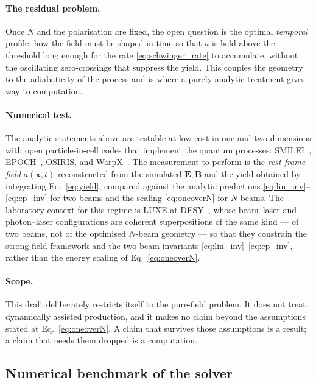 \documentclass[aps,prd,reprint,superscriptaddress,nofootinbib,floatfix]{revtex4-2}
\begin{document}
\paragraph{The residual problem.} Once $N$ and the polarisation are fixed, the
open question is the optimal \emph{temporal} profile: how the field must be
shaped in time so that $a$ is held above the threshold long enough for the
rate \eqref{eq:schwinger_rate} to accumulate, without the oscillating
zero-crossings that suppress the yield. This couples the geometry to the
adiabaticity of the process and is where a purely analytic treatment gives way
to computation.

\paragraph{Numerical test.} The analytic statements above are testable at low
cost in one and two dimensions with open particle-in-cell codes that implement
the quantum processes: SMILEI~\cite{Smilei2018}, EPOCH~\cite{EPOCH2015},
OSIRIS, and WarpX~\cite{WarpX2022}. The measurement to perform is the
\emph{rest-frame field} $a(\mathbf{x},t)$ reconstructed from the simulated
$\mathbf{E},\mathbf{B}$ and the yield obtained by integrating
Eq.~\eqref{eq:yield}, compared against the analytic predictions
\eqref{eq:lin_inv}--\eqref{eq:cp_inv} for two beams and the scaling
\eqref{eq:oneoverN} for $N$ beams. The laboratory context for this regime is
LUXE at DESY~\cite{LUXE2021}, whose beam--laser and photon--laser
configurations are coherent superpositions of the same kind --- of two beams,
not of the optimised $N$-beam geometry --- so that they constrain the
strong-field framework and the two-beam invariants
\eqref{eq:lin_inv}--\eqref{eq:cp_inv}, rather than the energy scaling of
Eq.~\eqref{eq:oneoverN}.

\paragraph{Scope.} This draft deliberately restricts itself to the pure-field
problem. It does not treat dynamically assisted production, and it makes no
claim beyond the assumptions stated at Eq.~\eqref{eq:oneoverN}. A claim that
survives those assumptions is a result; a claim that needs them dropped is a
computation.

\subsection{Numerical benchmark of the solver}
\end{document}
